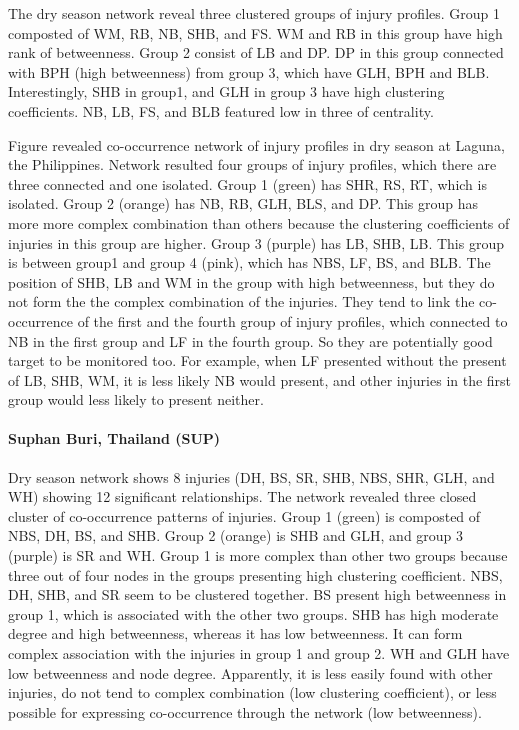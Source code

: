 The dry season network reveal three clustered groups of injury profiles. Group 1 composted of WM, RB, NB, SHB, and FS. WM and RB in this group have high rank of betweenness. Group 2 consist of LB and DP. DP in this group connected with BPH (high betweenness) from group 3, which have GLH, BPH and BLB. Interestingly, SHB in group1, and GLH in group 3 have high clustering coefficients. NB, LB, FS, and BLB featured low in three of centrality. 

Figure revealed co-occurrence network of injury profiles in dry season at Laguna, the Philippines. Network resulted four groups of injury profiles, which there are three connected and one isolated. Group 1 (green) has  SHR, RS, RT, which is isolated. Group 2 (orange) has NB, RB, GLH, BLS, and DP. This group has more more complex combination than others because the clustering coefficients of injuries in this group are higher. Group 3 (purple) has LB, SHB, LB. This group is between group1 and group 4 (pink), which has NBS, LF, BS, and BLB. The position of SHB, LB and WM in the group with high betweenness, but they do not form the the complex combination of the injuries. They tend to link the co-occurrence of the first and the fourth group of injury profiles, which connected to NB in the first group and LF in the fourth group. So they are potentially good target to be monitored too. For example, when LF presented without the present of LB, SHB, WM, it is less likely NB would present, and other injuries in the first group would less likely to present neither. 


\paragraph{Suphan Buri, Thailand (SUP)}

Dry season network shows 8 injuries (DH, BS, SR, SHB, NBS, SHR, GLH, and WH) showing 12 significant relationships. The network revealed three closed cluster of co-occurrence patterns of injuries. Group 1 (green) is composted of NBS, DH, BS, and SHB. Group 2 (orange) is SHB and GLH, and group 3 (purple) is SR and WH. Group 1 is more complex than other two groups because three out of four nodes in the groups presenting high clustering coefficient. NBS, DH, SHB, and SR seem to be clustered together. BS present high betweenness in group 1, which is associated with the other two groups. SHB has high moderate degree and high betweenness, whereas it has low betweenness.  It can form complex association with the injuries in group 1 and group 2.  WH and GLH have low betweenness and node degree. Apparently, it is less easily found with other injuries, do not tend to complex combination (low clustering coefficient), or less possible for expressing co-occurrence through the network (low betweenness). 


